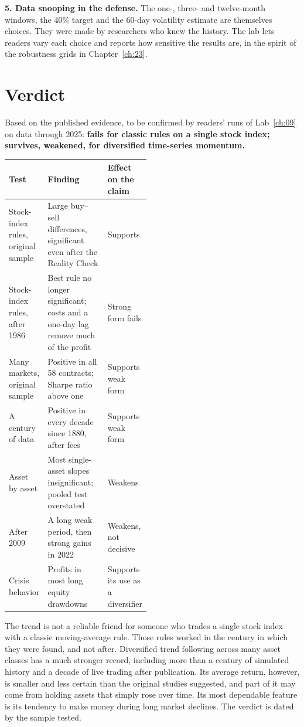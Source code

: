 \textbf{5. Data snooping in the defense.} The one-, three- and twelve-month windows, the 40\% target and the 60-day volatility estimate are themselves choices. They were made by researchers who knew the history. The lab lets readers vary each choice and reports how sensitive the results are, in the spirit of the robustness grids in Chapter~\ref{ch:23}.

\section{Verdict}
\label{sec:09-verdict}

Based on the published evidence, to be confirmed by readers' runs of Lab~\ref{ch:09} on data through 2025: \textbf{fails for classic rules on a single stock index; survives, weakened, for diversified time-series momentum.}

\begin{center}
\small
\begin{tabularx}{0.9\linewidth}{@{}>{\raggedright\arraybackslash}p{0.24\linewidth}>{\raggedright\arraybackslash}X>{\raggedright\arraybackslash}p{0.24\linewidth}@{}}
\toprule
Test & Finding & Effect on the claim \\
\midrule
Stock-index rules, original sample & Large buy--sell differences, significant even after the Reality Check & Supports \\
Stock-index rules, after 1986 & Best rule no longer significant; costs and a one-day lag remove much of the profit & Strong form fails \\
Many markets, original sample & Positive in all 58 contracts; Sharpe ratio above one & Supports weak form \\
A century of data & Positive in every decade since 1880, after fees & Supports weak form \\
Asset by asset & Most single-asset slopes insignificant; pooled test overstated & Weakens \\
After 2009 & A long weak period, then strong gains in 2022 & Weakens, not decisive \\
Crisis behavior & Profits in most long equity drawdowns & Supports its use as a diversifier \\
\bottomrule
\end{tabularx}
\end{center}

The trend is not a reliable friend for someone who trades a single stock index with a classic moving-average rule. Those rules worked in the century in which they were found, and not after. Diversified trend following across many asset classes has a much stronger record, including more than a century of simulated history and a decade of live trading after publication. Its average return, however, is smaller and less certain than the original studies suggested, and part of it may come from holding assets that simply rose over time. Its most dependable feature is its tendency to make money during long market declines. The verdict is dated by the sample tested.


